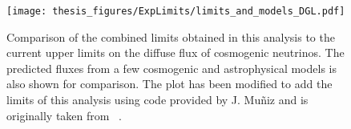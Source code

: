 \begin{figure}[h!]
  \centering
  \texttt{[image: thesis\_figures/ExpLimits/limits\_and\_models\_DGL.pdf]}
  \caption{Comparison of the combined limits obtained in this analysis to the current upper limits on the diffuse flux of cosmogenic neutrinos. The predicted fluxes from a few cosmogenic and astrophysical models is also shown for comparison. The plot has been modified to add the limits of this analysis using code provided by J. Muñiz and is originally taken from ~\cite{PierreAuger:2023pjg}.}
  \label{fig:Limit_comp_overall}
\end{figure}




